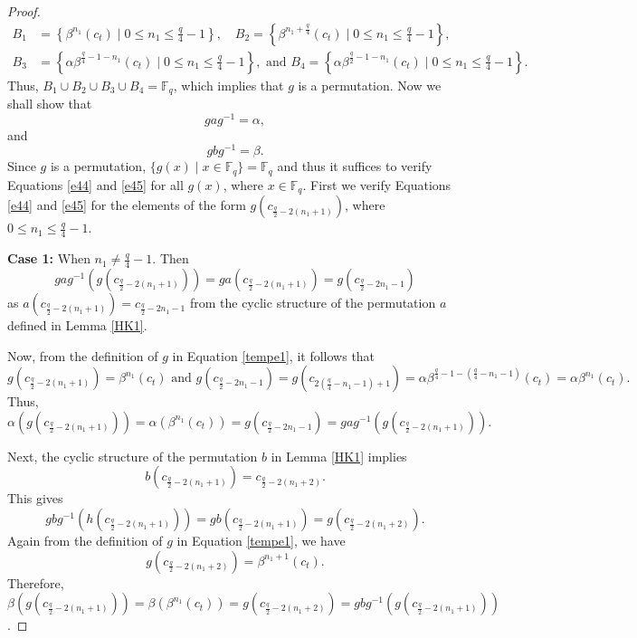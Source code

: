 \documentclass[11pt]{amsart}
\theoremstyle{plain}
\numberwithin{equation}{section}
\def\F{{\mathbb F}}
\begin{document}
\begin{proof}
$$
\begin{aligned}
B_1&=\left\{\beta^{n_1} (c_t) \mid 0 \leq n_1 \leq \frac{q}{4}-1\right\}, \quad B_2= \left\{\beta^{n_1+\frac{q}{4}}(c_t)\mid 0 \leq n_1 \leq \frac{q}{4}-1\right\},\\
B_3&=\left\{\alpha \beta^{\frac{q}{4}-1-n_1}(c_t)\mid 0 \leq n_1 \leq \frac{q}{4}-1\right\},  \text{ and } B_4=\left\{\alpha \beta^{\frac{q}{2}-1-n_1}(c_t) \mid 0 \leq n_1 \leq \frac{q}{4}-1\right\}.
\end{aligned}
$$
Thus, $B_1\cup B_2 \cup B_3 \cup B_4=\F_q$, which implies that $g$ is a permutation. Now we shall show that 
\begin{equation}\label{e44}
gag^{-1}=\alpha,
\end{equation} 
and 
\begin{equation}\label{e45}
gbg^{-1}=\beta.
\end{equation}
Since $g$ is a permutation, $\{g(x) \mid x \in \F_q\}=\F_q$ and thus it suffices  to verify Equations \eqref{e44} and \eqref{e45} for all $g(x)$, where $x \in \F_q$. First we verify Equations \eqref{e44} and \eqref{e45} for the elements of the form $g(c_{\frac{q}{2}-2(n_1+1)})$, where $0\leq  n_1 \leq \frac{q}{4}-1$. 

\textbf{Case 1:}
When $n_1 \neq \frac{q}{4}-1$. Then 
\[
gag^{-1}(g(c_{\frac{q}{2}-2(n_1+1)}))=ga(c_{\frac{q}{2}-2(n_1+1)})= g(c_{\frac{q}{2}-2n_1-1})
\]
as $a(c_{\frac{q}{2}-2(n_1+1)})=c_{\frac{q}{2}-2n_1-1}$ from the cyclic structure of the permutation $a$ defined in Lemma \ref{HK1}. 

Now, from the definition of $g$ in Equation \eqref{tempe1}, it follows that
\[
g(c_{\frac{q}{2}-2(n_1+1)})=\beta^{n_1}(c_t) \text{ and } g(c_{\frac{q}{2}-2n_1-1})=g(c_{2(\frac{q}{4}-n_1-1)+1})=\alpha \beta^{\frac{q}{4}-1-(\frac{q}{4}-n_1-1)}(c_t)=\alpha \beta^{n_1}(c_t).
\]
Thus, $$\alpha (g(c_{\frac{q}{2}-2(n_1+1)}))=\alpha (\beta^{n_1}(c_t))=g(c_{\frac{q}{2}-2n_1-1})=gag^{-1}(g(c_{\frac{q}{2}-2(n_1+1)})).$$


Next, the cyclic structure of the permutation $b$ in Lemma \ref{HK1} implies
\[
b(c_{\frac{q}{2}-2(n_1+1)})=c_{\frac{q}{2}-2(n_1+2)}.
\]
This gives
\[
gbg^{-1}(h(c_{\frac{q}{2}-2(n_1+1)}))=gb(c_{\frac{q}{2}-2(n_1+1)})=g(c_{\frac{q}{2}-2(n_1+2)}). 
\]
Again from the definition of $g$ in Equation \eqref{tempe1}, we have 
\[
g(c_{\frac{q}{2}-2(n_1+2)})= \beta^{n_1+1}(c_t).
\]
Therefore, $\beta (g(c_{\frac{q}{2}-2(n_1+1)}))=\beta(\beta^{n_1}(c_t))=g(c_{\frac{q}{2}-2(n_1+2)})=gbg^{-1}(g(c_{\frac{q}{2}-2(n_1+1)}))$. 


\end{proof}
\end{document}
